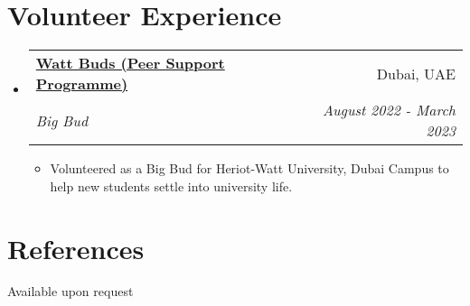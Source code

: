 \documentclass[a4paper,20pt]{article}
\makeatletter
\newcommand{\resumeItemWithoutTitle}[1] {
	\item\small{
		{#1 \vspace{-2pt}}
	}
}
\newcommand{\resumeSubheading}[4] {
	\vspace{-1pt}\item
	\begin{tabular*}{0.97\textwidth}{l@{\extracolsep{\fill}}r}
		\textbf{#1} & #2 \\
		\textit{#3} & \textit{#4} \\
	\end{tabular*}\vspace{-5pt}
}
\newcommand{\resumeSubHeadingListStart}{\begin{itemize}[leftmargin=*]}
\newcommand{\resumeSubHeadingListEnd}{\end{itemize}}
\newcommand{\resumeItemListStart}{\begin{itemize}}
\newcommand{\resumeItemListEnd}{\end{itemize}\vspace{-5pt}}
\makeatother
\begin{document}
\vspace{-2pt}
\section{Volunteer Experience}
	\resumeSubHeadingListStart
		\resumeSubheading{\href{https://www.hw.ac.uk/uk/students/studies/wattbuds-dubai.htm}{Watt Buds (Peer Support Programme)}}{Dubai, UAE}
		{Big Bud}{August 2022 - March 2023}
			\resumeItemListStart
				\resumeItemWithoutTitle{Volunteered as a Big Bud for Heriot-Watt University, Dubai Campus to help new students settle into university life.}
			\resumeItemListEnd


	\resumeSubHeadingListEnd

\vspace{-5pt}
\section{References}
Available upon request
\end{document}
